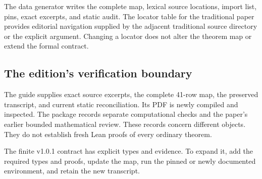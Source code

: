 The data generator writes the complete map, lexical source locations, import list, pins, exact excerpts, and static audit. The locator table for the traditional paper provides editorial navigation supplied by the adjacent traditional source directory or the explicit  argument. Changing a locator does not alter the theorem map or extend the formal contract.

\subsection{The edition's verification boundary}
The guide supplies exact source excerpts, the complete 41-row map, the preserved transcript, and current static reconciliation. Its PDF is newly compiled and inspected. The package records separate computational checks and the paper's earlier bounded mathematical review. These records concern different objects. They do not establish fresh Lean proofs of every ordinary theorem.

The finite v1.0.1 contract has explicit types and evidence. To expand it, add the required types and proofs, update the map, run the pinned or newly documented environment, and retain the new transcript.
